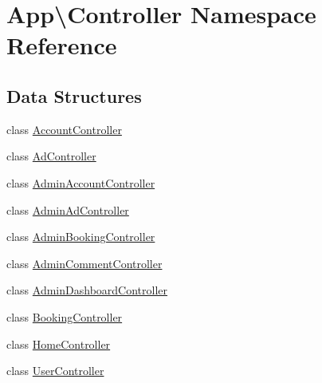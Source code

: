 \hypertarget{namespace_app_1_1_controller}{}\section{App\textbackslash{}Controller Namespace Reference}
\label{namespace_app_1_1_controller}
\subsection*{Data Structures}
\begin{DoxyCompactItemize}
\item 
class \mbox{\hyperlink{class_app_1_1_controller_1_1_account_controller}{Account\+Controller}}
\item 
class \mbox{\hyperlink{class_app_1_1_controller_1_1_ad_controller}{Ad\+Controller}}
\item 
class \mbox{\hyperlink{class_app_1_1_controller_1_1_admin_account_controller}{Admin\+Account\+Controller}}
\item 
class \mbox{\hyperlink{class_app_1_1_controller_1_1_admin_ad_controller}{Admin\+Ad\+Controller}}
\item 
class \mbox{\hyperlink{class_app_1_1_controller_1_1_admin_booking_controller}{Admin\+Booking\+Controller}}
\item 
class \mbox{\hyperlink{class_app_1_1_controller_1_1_admin_comment_controller}{Admin\+Comment\+Controller}}
\item 
class \mbox{\hyperlink{class_app_1_1_controller_1_1_admin_dashboard_controller}{Admin\+Dashboard\+Controller}}
\item 
class \mbox{\hyperlink{class_app_1_1_controller_1_1_booking_controller}{Booking\+Controller}}
\item 
class \mbox{\hyperlink{class_app_1_1_controller_1_1_home_controller}{Home\+Controller}}
\item 
class \mbox{\hyperlink{class_app_1_1_controller_1_1_user_controller}{User\+Controller}}
\end{DoxyCompactItemize}
